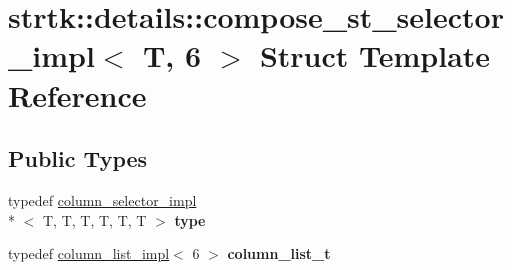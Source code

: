 \hypertarget{structstrtk_1_1details_1_1compose__st__selector__impl_3_01T_00_016_01_4}{\section{strtk\-:\-:details\-:\-:compose\-\_\-st\-\_\-selector\-\_\-impl$<$ T, 6 $>$ Struct Template Reference}
\label{structstrtk_1_1details_1_1compose__st__selector__impl_3_01T_00_016_01_4}
}
\subsection*{Public Types}
\begin{DoxyCompactItemize}
\item 
\hypertarget{structstrtk_1_1details_1_1compose__st__selector__impl_3_01T_00_016_01_4_add5cdab394e2bfc06d2bf81889db7447}{typedef \hyperlink{classstrtk_1_1details_1_1column__selector__impl}{column\-\_\-selector\-\_\-impl}\\*
$<$ T, T, T, T, T, T $>$ {\bfseries type}}\label{structstrtk_1_1details_1_1compose__st__selector__impl_3_01T_00_016_01_4_add5cdab394e2bfc06d2bf81889db7447}

\item 
\hypertarget{structstrtk_1_1details_1_1compose__st__selector__impl_3_01T_00_016_01_4_a7fef96d0c0fa7cfc525947979b6e63f7}{typedef \hyperlink{structstrtk_1_1details_1_1column__list__impl}{column\-\_\-list\-\_\-impl}$<$ 6 $>$ {\bfseries column\-\_\-list\-\_\-t}}\label{structstrtk_1_1details_1_1compose__st__selector__impl_3_01T_00_016_01_4_a7fef96d0c0fa7cfc525947979b6e63f7}

\end{DoxyCompactItemize}
